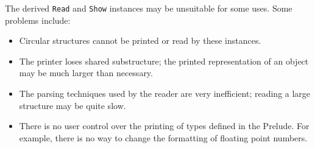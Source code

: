 
The derived \mbox{\tt Read} and \mbox{\tt Show} instances may be unsuitable for some
uses.  Some problems include:
\begin{itemize}
\item Circular structures cannot be printed or read by these
instances.
\item The printer loses shared substructure; the printed
representation of an object may be much larger than necessary.
\item The parsing techniques used by the reader are very inefficient;
reading a large structure may be quite slow.
\item There is no user control over the printing of types defined in
the Prelude.  For example, there is no way to change the
formatting of floating point numbers.
\end{itemize}


